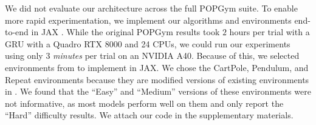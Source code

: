\documentclass{article}
\begin{document}
We did not evaluate our architecture across the full POPGym suite. To enable more rapid experimentation, we implement our algorithms and environments end-to-end in JAX \cite{jax2018github, lu2022discovered}. While the original POPGym results took $2$ hours per trial with a GRU with a Quadro RTX 8000 and 24 CPUs, we could run our experiments using only $3$ \textit{minutes} per trial on an NVIDIA A40. Because of this, we selected environments from \citet{morad2023popgym} to implement in JAX. We chose the CartPole, Pendulum, and Repeat environments because they are modified versions of existing environments in \citet{gymnax2022github}. We found that the ``Easy'' and ``Medium'' versions of these environments were not informative, as most models perform well on them and only report the ``Hard'' difficulty results.
We attach our code in the supplementary materials.
\end{document}
